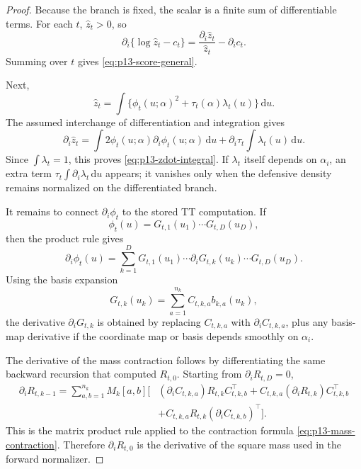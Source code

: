 \documentclass[11pt]{article}
\newcommand{\dd}{\mathrm{d}}
\theoremstyle{definition}
\theoremstyle{remark}
\begin{document}
\begin{proof}
Because the branch is fixed, the scalar is a finite sum of differentiable
terms.  For each \(t\), \(\widehat z_t>0\), so
\[
  \partial_i\{\log\widehat z_t-c_t\}
  =
  \frac{\partial_i\widehat z_t}{\widehat z_t}-\partial_i c_t.
\]
Summing over \(t\) gives \eqref{eq:p13-score-general}.

Next,
\[
  \widehat z_t
  =
  \int\{\phi_t(u;\alpha)^2+\tau_t(\alpha)\lambda_t(u)\}\,\dd u.
\]
The assumed interchange of differentiation and integration gives
\[
  \partial_i\widehat z_t
  =
  \int 2\phi_t(u;\alpha)\partial_i\phi_t(u;\alpha)\,\dd u
  +
  \partial_i\tau_t\int\lambda_t(u)\,\dd u.
\]
Since \(\int\lambda_t=1\), this proves \eqref{eq:p13-zdot-integral}.  If
\(\lambda_t\) itself depends on \(\alpha_i\), an extra term
\(\tau_t\int\partial_i\lambda_t\,\dd u\) appears; it vanishes only when the
defensive density remains normalized on the differentiated branch.

It remains to connect \(\partial_i\phi_t\) to the stored TT computation.  If
\[
  \phi_t(u)=G_{t,1}(u_1)\cdots G_{t,D}(u_D),
\]
then the product rule gives
\[
  \partial_i\phi_t(u)
  =
  \sum_{k=1}^D
  G_{t,1}(u_1)\cdots
  \partial_iG_{t,k}(u_k)\cdots
  G_{t,D}(u_D).
  \label{eq:p13-tt-product-rule}
\]
Using the basis expansion
\[
  G_{t,k}(u_k)=\sum_{a=1}^{n_k}C_{t,k,a}b_{k,a}(u_k),
\]
the derivative \(\partial_iG_{t,k}\) is obtained by replacing
\(C_{t,k,a}\) with \(\partial_iC_{t,k,a}\), plus any basis-map derivative if
the coordinate map or basis depends smoothly on \(\alpha_i\).

The derivative of the mass contraction follows by differentiating the same
backward recursion that computed \(R_{t,0}\).  Starting from
\(\partial_iR_{t,D}=0\),
\[
\begin{aligned}
  \partial_i R_{t,k-1}
  =
  \sum_{a,b=1}^{n_k}M_k[a,b]\Big[
  &(\partial_iC_{t,k,a})R_{t,k}C_{t,k,b}^\top
  +C_{t,k,a}(\partial_iR_{t,k})C_{t,k,b}^\top\\
  &+C_{t,k,a}R_{t,k}(\partial_iC_{t,k,b})^\top
  \Big].
  \label{eq:p13-rdot-contraction}
\end{aligned}
\]
This is the matrix product rule applied to the contraction formula
\eqref{eq:p13-mass-contraction}.  Therefore
\(\partial_iR_{t,0}\) is the derivative of the square mass used in the forward
normalizer.


\end{proof}
\end{document}
